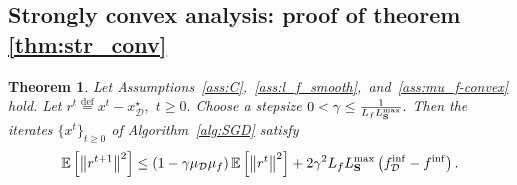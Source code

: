 \documentclass{article}
\newcommand{\bb}{\mathbb}
\newcommand{\cD}{\mathcal{D}}
\newcommand{\eqdef}{\stackrel{\text{def}}{=}}
\newcommand{\Exp}[1]{{\bb E}\left[#1\right]}
\newtheorem{theorem}{Theorem}
\theoremstyle{plain}
\newcommand{\tf}{f_{\mathcal{D}}}
\newcommand{\mS}{{\bf S}}
\theoremstyle{plain}
\theoremstyle{definition}
\theoremstyle{remark}
\begin{document}
\subsection{Strongly convex analysis: proof of theorem \ref{thm:str_conv}}
\begin{theorem}
	Let Assumptions~\ref{ass:C},~\ref{ass:l_f_smooth},~and~\ref{ass:mu_f-convex} hold. Let $r^t\eqdef x^t - x_\cD^\star,$ $t\geq 0.$ Choose a stepsize $0<\gamma \leq \frac{1}{L_fL_{\mS}^{\max}}.$ Then the iterates $\{x^t\}_{t\geq 0}$ of Algorithm~\ref{alg:SGD} satisfy
    \begin{equation}\label{eq:main_strcvx_basicsgd}
	\begin{split}
		\Exp{\left\|r^{t+1}\right\|^2} & \leq \left(1-\gamma\mu_{\mathcal{D}}\mu_f\right)\Exp{\left\|r^{t}\right\|^2} + 2\gamma^2L_fL_{\mS}^{\max}\left(\tf^{\inf} - f^{\inf}\right).\\
	\end{split}
    \end{equation}
\end{theorem}
\end{document}
